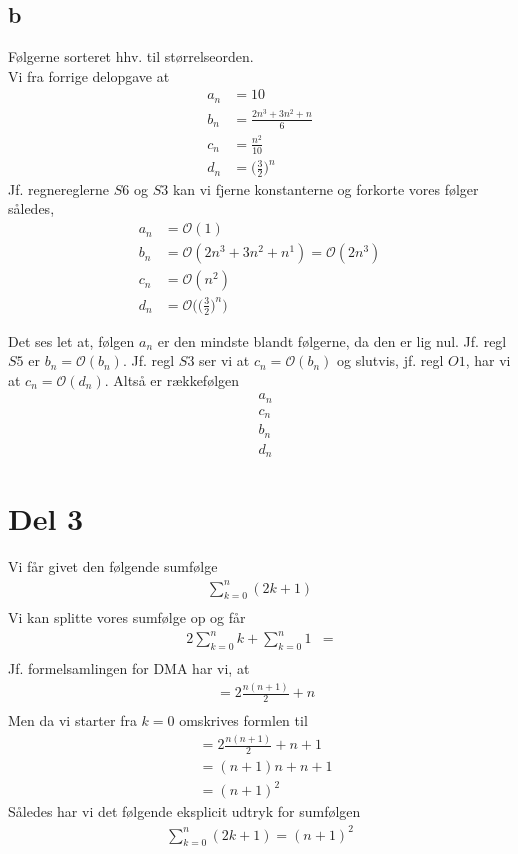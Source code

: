 \documentclass[a4paper]{article}
\begin{document}
\subsection*{b} %
\label{sub:b}
Følgerne sorteret hhv. til størrelseorden.\\
Vi fra forrige delopgave at 
\begin{align*}
a_n &= 10 \\
b_n &= \frac{2n^3+3n^2+n}{6} \\
c_n &= \frac{n^2}{10} \\
d_n &= \Big(\frac{3}{2}\Big)^n
\end{align*}
Jf. regnereglerne $S6$ og $S3$ kan vi fjerne konstanterne og forkorte vores følger således,
\begin{align*}
a_n &= \mathcal{O}(1)\\
b_n &= \mathcal{O}(2n^3+3n^2+n^1) = \mathcal{O}(2n^3)\\
c_n &= \mathcal{O}(n^2) \\
d_n &= \mathcal{O}\Big(\Big(\frac{3}{2}\Big)^n\Big)
\end{align*}

Det ses let at, følgen $a_n$ er den mindste blandt følgerne, da den er lig nul. Jf. regl $S5$ er $b_n = \mathcal{O}(b_n)$. Jf. regl $S3$ ser vi at $c_n = \mathcal{O}(b_n)$ og slutvis, jf. regl $O1$, har vi at $c_n = \mathcal{O}(d_n)$. Altså er rækkefølgen
\begin{align*}
&a_n \\
&c_n \\
&b_n \\
&d_n 
\end{align*}


\section*{Del 3}
Vi får givet den følgende sumfølge
\begin{align*}
\sum_{k=0}^{n} (2k+1) \\
\end{align*}
Vi kan splitte vores sumfølge op og får 
\begin{align*}
2\sum_{k=0}^{n}k + \sum_{k=0}^{n} 1 &=\\ 
\end{align*}
Jf. formelsamlingen for DMA har vi, at
\begin{align*}
&= 2\frac{n(n+1)}{2}+n \\
\end{align*}
Men da vi starter fra $k=0$ omskrives formlen til 
\begin{align*}
&= 2\frac{n(n+1)}{2}+n+1 \\
&= (n+1)n+n+1 \\
&= (n+1)^2
\end{align*}
Således har vi det følgende eksplicit udtryk for sumfølgen
\begin{align*}
\sum_{k=0}^{n} (2k+1) = (n+1)^2
\end{align*}
\end{document}

